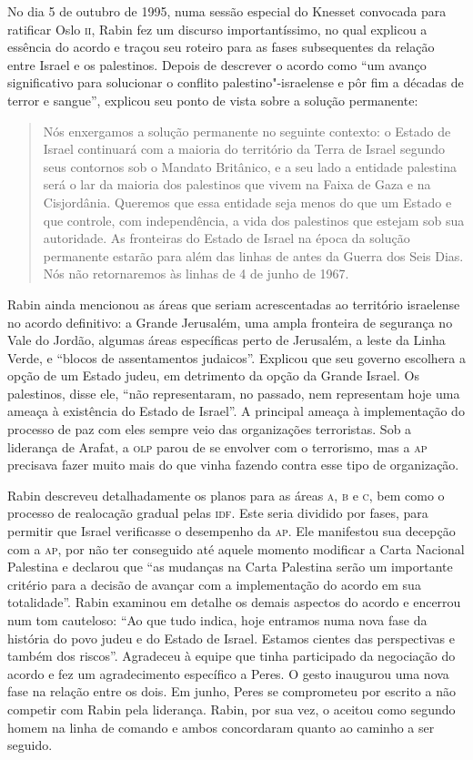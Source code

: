 No dia 5 de outubro de 1995, numa sessão especial do Knesset convocada
para ratificar Oslo \textsc{ii}, Rabin fez um discurso importantíssimo, no qual
explicou a essência do acordo e traçou seu roteiro para as fases
subsequentes da relação entre Israel e os palestinos. Depois de
descrever o acordo como ``um avanço significativo para solucionar o
conflito palestino"-israelense e pôr fim a décadas de terror e sangue'',
explicou seu ponto de vista sobre a solução permanente:

\begin{quote}
Nós enxergamos a solução permanente no seguinte contexto: o Estado de
Israel continuará com a maioria do território da Terra de Israel segundo
seus contornos sob o Mandato Britânico, e a seu lado a entidade
palestina será o lar da maioria dos palestinos que vivem na Faixa de
Gaza e na Cisjordânia. Queremos que essa entidade seja menos do que um
Estado e que controle, com independência, a vida dos palestinos que estejam
sob sua autoridade. As fronteiras do Estado de Israel na época da
solução permanente estarão para além das linhas de antes da Guerra dos
Seis Dias. Nós não retornaremos às linhas de 4 de junho de 1967.
\end{quote}

Rabin ainda mencionou as áreas que seriam acrescentadas ao território
israelense no acordo definitivo: a Grande Jerusalém, uma ampla fronteira
de segurança no Vale do Jordão, algumas áreas específicas perto de
Jerusalém, a leste da Linha Verde, e ``blocos de assentamentos
judaicos''. Explicou que seu governo escolhera a opção de um Estado
judeu, em detrimento da opção da Grande Israel. Os palestinos, disse
ele, ``não representaram, no passado, nem representam hoje uma ameaça à
existência do Estado de Israel''. A principal ameaça à implementação do
processo de paz com eles sempre veio das organizações terroristas. Sob a
liderança de Arafat, a \textsc{olp} parou de se envolver com o terrorismo, mas a
\textsc{ap} precisava fazer muito mais do que vinha fazendo contra esse tipo de
organização.

Rabin descreveu detalhadamente os planos 
para as áreas \textsc{a}, \textsc{b} e \textsc{c}, bem
como o processo de realocação gradual pelas \textsc{idf}. Este seria
dividido por fases, para permitir que Israel verificasse o desempenho da
\textsc{ap}. Ele manifestou sua decepção com a \textsc{ap}, por não ter conseguido até
aquele momento modificar a Carta Nacional Palestina e declarou que ``as
mudanças na Carta Palestina serão um importante critério para a decisão
de avançar com a implementação do acordo em sua totalidade''. Rabin
examinou em detalhe os demais aspectos do acordo e encerrou num tom
cauteloso: ``Ao que tudo indica, hoje entramos numa nova fase da
história do povo judeu e do Estado de Israel. Estamos cientes das
perspectivas e também dos riscos''. Agradeceu à equipe que tinha
participado da negociação do acordo e fez um agradecimento específico a
Peres. O gesto inaugurou uma nova fase na relação entre os dois. Em
junho, Peres se comprometeu por escrito a não competir com Rabin pela
liderança. Rabin, por sua vez, o aceitou como segundo homem na linha de
comando e ambos concordaram quanto ao caminho a ser seguido.

